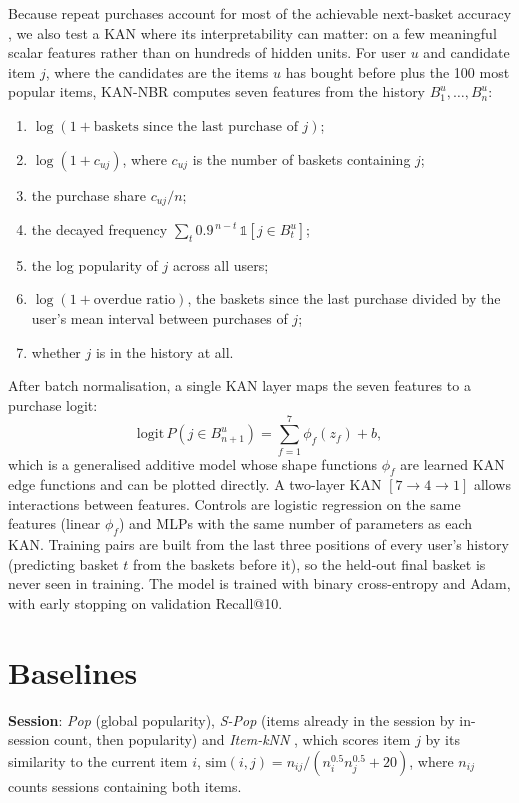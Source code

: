 Because repeat purchases account for most of the achievable next-basket
accuracy \cite{li2023}, we also test a KAN where its interpretability can matter:
on a few meaningful scalar features rather than on hundreds of hidden units.
For user $u$ and candidate item $j$, where the candidates are the items $u$ has
bought before plus the 100 most popular items, KAN-NBR computes seven features
from the history $B^u_1, \ldots, B^u_n$:

\begin{enumerate}
    \item $\log(1 + \text{baskets since the last purchase of } j)$;
    \item $\log(1 + c_{uj})$, where $c_{uj}$ is the number of baskets containing $j$;
    \item the purchase share $c_{uj}/n$;
    \item the decayed frequency $\sum_t 0.9^{\,n-t}\, \mathbb{1}[j \in B^u_t]$;
    \item the log popularity of $j$ across all users;
    \item $\log(1 + \text{overdue ratio})$, the baskets since the last purchase
          divided by the user's mean interval between purchases of $j$;
    \item whether $j$ is in the history at all.
\end{enumerate}

After batch normalisation, a single KAN layer maps the seven features to a
purchase logit:
\begin{equation}
\mathrm{logit}\, P(j \in B^u_{n+1}) = \sum_{f=1}^{7} \phi_f(z_f) + b,
\end{equation}
which is a generalised additive model whose shape functions $\phi_f$ are learned
KAN edge functions and can be plotted directly. A two-layer KAN
$[7 \to 4 \to 1]$ allows interactions between features. Controls are logistic
regression on the same features (linear $\phi_f$) and MLPs with the same number
of parameters as each KAN. Training pairs are built from the last three positions
of every user's history (predicting basket $t$ from the baskets before it), so
the held-out final basket is never seen in training. The model is trained with
binary cross-entropy and Adam, with early stopping on validation Recall@10.

\section{Baselines}

\textbf{Session}: \emph{Pop} (global popularity), \emph{S-Pop} (items already in
the session by in-session count, then popularity) and \emph{Item-kNN}
\cite{hidasi2016}, which scores item $j$ by its similarity to the current item $i$,
$\mathrm{sim}(i,j) = n_{ij} / (n_i^{0.5} n_j^{0.5} + 20)$, where $n_{ij}$ counts
sessions containing both items.

